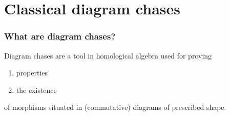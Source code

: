 \begin{frame}
 \frametitle{}
 \tableofcontents
\end{frame}

\section{Classical diagram chases}


\begin{frame}[fragile]
 \frametitle{What are diagram chases?}
 \pause
 \begin{block}{}
  Diagram chases are a tool in homological algebra
  used for proving 
  \pause
  \begin{enumerate}
   \item properties
   \pause
   \item {the existence}
   \pause
  \end{enumerate}
  of morphisms 
  \pause
  situated in (commutative) diagrams of prescribed shape.
 \end{block}
\end{frame}


